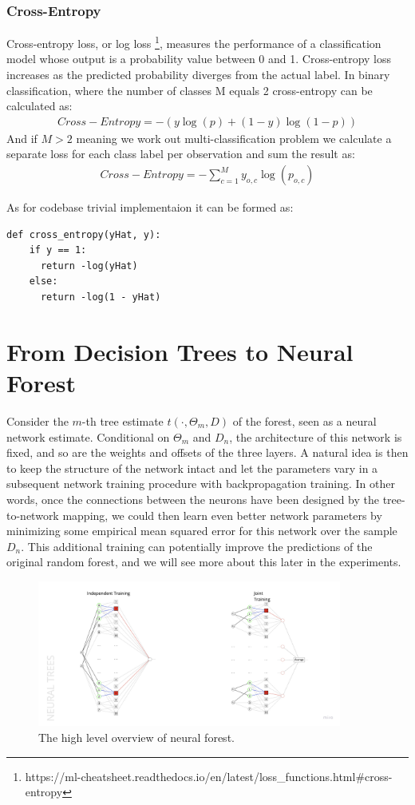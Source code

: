 \documentclass{article}
\begin{document}
\subsubsection{Cross-Entropy}
Cross-entropy loss, or log loss \footnote{https://ml-cheatsheet.readthedocs.io/en/latest/loss_functions.html#cross-entropy}, measures the performance of a classification model whose output is a probability value between 0 and 1. Cross-entropy loss increases as the predicted probability diverges from the actual label.
In binary classification, where the number of classes M equals 2 cross-entropy can be calculated as:
\begin{align*}
Cross-Entropy = -{(y\log(p) + (1 - y)\log(1 - p))}
\end{align*}
And if $M > 2$ meaning we work out multi-classification problem we calculate a separate loss for each class label per observation and sum the result as:
\begin{align*}
Cross-Entropy = -\sum_{c=1}^My_{o,c}\log(p_{o,c})
\end{align*}

As for codebase trivial implementaion it can be formed as:  
\begin{lstlisting}
def cross_entropy(yHat, y):
    if y == 1:
      return -log(yHat)
    else:
      return -log(1 - yHat)
\end{lstlisting}

\section{From Decision Trees to Neural Forest}
Consider the $m$-th tree estimate $t(\cdot, \Theta_m, D)$ of the forest, seen as a neural network estimate. Conditional on $\Theta_m$ and $D_n$, the architecture of this network is fixed, and so are the weights and offsets of the three layers. A natural idea is then to keep the structure of the network intact and let the parameters vary in a subsequent network training procedure with backpropagation training. In other words, once the connections between the neurons have been designed by the tree-to-network mapping, we could then learn even better network parameters by minimizing some empirical mean squared error for this network over the sample $D_n$. This additional training can potentially improve the predictions of the original random forest, and we will see more about this later in the experiments.
\begin{figure}[h]
    \centering \includegraphics[width=10cm]{images/NeuralTrees.jpg}
    \caption {The high level overview of neural forest.}
    \label{fig:ct_spine}
\end{figure}
\end{document}
